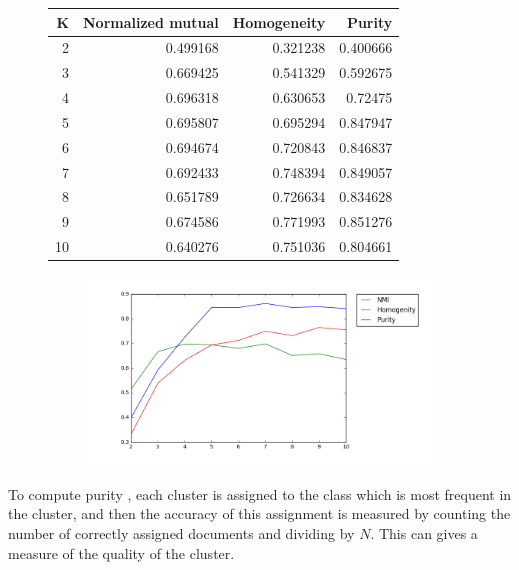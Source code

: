 \documentclass[11pt]{article}
\theoremstyle{plain}
\begin{document}
\begin{figure}[h]
\centering
\begin{subtable}[h]{0.45\textwidth}
	 \begin{tabular}{|r | r | r | r|}
\hline
   K &   Normalized mutual &   Homogeneity &   Purity \\
\hline
   2 &            0.499168 &      0.321238 & 0.400666 \\
   3 &            0.669425 &      0.541329 & 0.592675 \\
   4 &            0.696318 &      0.630653 & 0.72475  \\
   5 &            0.695807 &      0.695294 & 0.847947 \\
   6 &            0.694674 &      0.720843 & 0.846837 \\
   7 &            0.692433 &      0.748394 & 0.849057 \\
   8 &            0.651789 &      0.726634 & 0.834628 \\
   9 &            0.674586 &      0.771993 & 0.851276 \\
  10 &            0.640276 &      0.751036 & 0.804661 \\
\hline

\end{tabular}
\end{subtable}
\begin{subfigure}[h]{0.45\textwidth}
 \centering

\includegraphics[scale=0.35]{4}

\end{subfigure}
\end{figure}
To compute purity , each cluster is assigned to the class which is most frequent in the cluster, and then the accuracy of this assignment is measured by counting the number of correctly assigned documents and dividing by $N$. This can gives a measure of the quality of the cluster.
 
 
\end{document}
